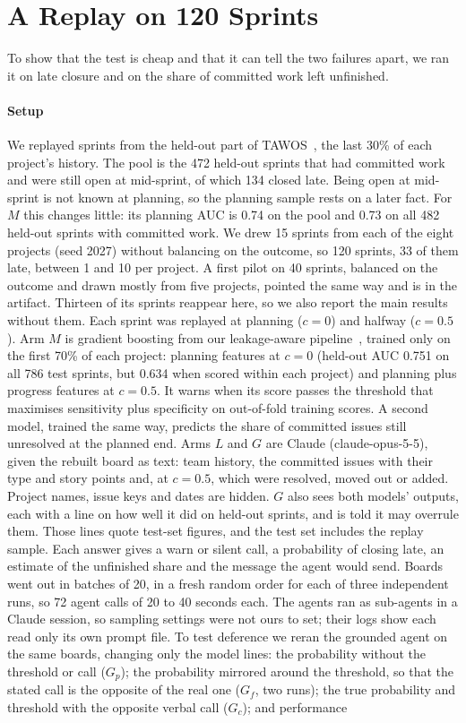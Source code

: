 \documentclass[conference]{IEEEtran}
\begin{document}
\section{A Replay on 120 Sprints}
\label{sec:study}

To show that the test is cheap and that it can tell the two failures apart, we ran it on late closure and on the share of committed work left unfinished.

\paragraph{Setup} We replayed sprints from the held-out part of TAWOS~\cite{tawos}, the last 30\% of each project's history. The pool is the 472 held-out sprints that had committed work and were still open at mid-sprint, of which 134 closed late. Being open at mid-sprint is not known at planning, so the planning sample rests on a later fact. For $M$ this changes little: its planning AUC is 0.74 on the pool and 0.73 on all 482 held-out sprints with committed work. We drew 15 sprints from each of the eight projects (seed 2027) without balancing on the outcome, so 120 sprints, 33 of them late, between 1 and 10 per project. A first pilot on 40 sprints, balanced on the outcome and drawn mostly from five projects, pointed the same way and is in the artifact. Thirteen of its sprints reappear here, so we also report the main results without them. Each sprint was replayed at planning ($c=0$) and halfway ($c=0.5$). Arm $M$ is gradient boosting from our leakage-aware pipeline~\cite{artifact}, trained only on the first 70\% of each project: planning features at $c=0$ (held-out AUC 0.751 on all 786 test sprints, but 0.634 when scored within each project) and planning plus progress features at $c=0.5$. It warns when its score passes the threshold that maximises sensitivity plus specificity on out-of-fold training scores. A second model, trained the same way, predicts the share of committed issues still unresolved at the planned end. Arms $L$ and $G$ are Claude (claude-opus-5-5), given the rebuilt board as text: team history, the committed issues with their type and story points and, at $c=0.5$, which were resolved, moved out or added. Project names, issue keys and dates are hidden. $G$ also sees both models' outputs, each with a line on how well it did on held-out sprints, and is told it may overrule them. Those lines quote test-set figures, and the test set includes the replay sample. Each answer gives a warn or silent call, a probability of closing late, an estimate of the unfinished share and the message the agent would send. Boards went out in batches of 20, in a fresh random order for each of three independent runs, so 72 agent calls of 20 to 40 seconds each. The agents ran as sub-agents in a Claude session, so sampling settings were not ours to set; their logs show each read only its own prompt file. To test deference we reran the grounded agent on the same boards, changing only the model lines: the probability without the threshold or call ($G_p$); the probability mirrored around the threshold, so that the stated call is the opposite of the real one ($G_f$, two runs); the true probability and threshold with the opposite verbal call ($G_c$); and performance 
\end{document}
